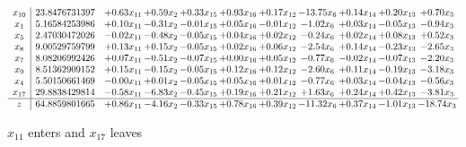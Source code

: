 \documentclass[9pt]{article}
\begin{document}
 \[\begin{array}{c| c c@{\hskip 2pt} c@{\hskip 2pt} c@{\hskip 2pt} c@{\hskip 2pt} c@{\hskip 2pt} c@{\hskip 2pt} c@{\hskip 2pt} c@{\hskip 2pt} c@{\hskip 2pt} }
 x_{10}   &  23.8476731397 & +  0.63 x_{11} & +  0.59 x_{2} & +  0.33 x_{15} & +  0.93 x_{16} & +  0.17 x_{12} & -13.75 x_{6} & +  0.14 x_{14} & +  0.20 x_{13} & +  0.70 x_{3}\\
 x_{1}   &  5.16584253986 & +  0.10 x_{11} & -0.31 x_{2} & -0.01 x_{15} & +  0.05 x_{16} & -0.01 x_{12} & -1.02 x_{6} & +  0.03 x_{14} & -0.05 x_{13} & -0.94 x_{3}\\
 x_{5}   &  2.47030472026 & -0.02 x_{11} & -0.48 x_{2} & -0.05 x_{15} & +  0.04 x_{16} & +  0.02 x_{12} & -0.24 x_{6} & +  0.02 x_{14} & +  0.08 x_{13} & +  0.52 x_{3}\\
 x_{8}   &  9.00529759799 & +  0.13 x_{11} & +  0.15 x_{2} & -0.05 x_{15} & +  0.02 x_{16} & +  0.06 x_{12} & -2.54 x_{6} & +  0.14 x_{14} & -0.23 x_{13} & -2.65 x_{3}\\
 x_{7}   &  8.08206992426 & +  0.07 x_{11} & -0.51 x_{2} & -0.07 x_{15} & +  0.00 x_{16} & +  0.05 x_{12} & -0.77 x_{6} & -0.02 x_{14} & -0.07 x_{13} & -2.20 x_{3}\\
 x_{9}   &  8.51362909152 & +  0.15 x_{11} & -0.15 x_{2} & -0.05 x_{15} & +  0.12 x_{16} & +  0.12 x_{12} & -2.60 x_{6} & +  0.11 x_{14} & -0.19 x_{13} & -3.18 x_{3}\\
 x_{4}   &  5.50150661469 & -0.00 x_{11} & +  0.01 x_{2} & -0.05 x_{15} & +  0.05 x_{16} & +  0.01 x_{12} & -0.77 x_{6} & +  0.03 x_{14} & -0.04 x_{13} & -0.56 x_{3}\\
 x_{17}   &  29.8838429814 & -0.58 x_{11} & -6.83 x_{2} & -0.45 x_{15} & +  0.19 x_{16} & +  0.21 x_{12} & +  1.63 x_{6} & +  0.24 x_{14} & +  0.42 x_{13} & -3.81 x_{3}\\
\hline
z    &  64.8859801665 & +  0.86 x_{11} & -4.16 x_{2} & -0.33 x_{15} & +  0.78 x_{16} & +  0.39 x_{12} & -11.32 x_{6} & +  0.37 x_{14} & -1.01 x_{13} & -18.74 x_{3}\\
\end{array}\]


 $ x_{11} $ enters and $ x_{17} $ leaves 
\end{document}
